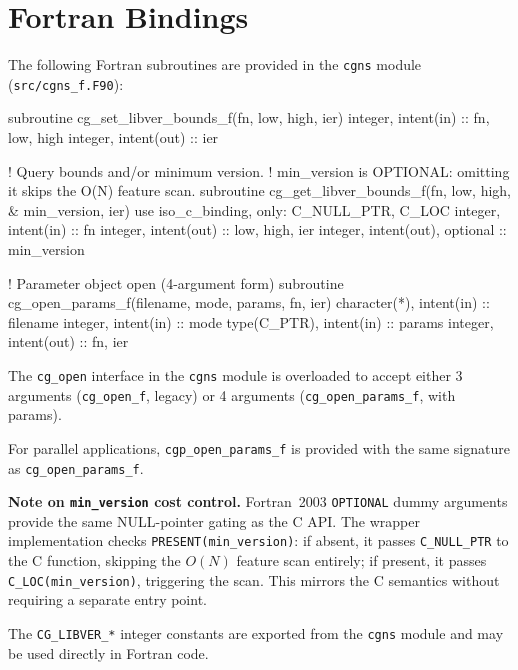 \documentclass[11pt,letterpaper]{article}
\makeatletter
\let\cgns@orig@lstlisting\lstlisting
\let\cgns@endorig@lstlisting\endlstlisting
\renewenvironment{lstlisting}
  {\par\needspace{5\baselineskip}\nolinenumbers\cgns@orig@lstlisting}
  {\cgns@endorig@lstlisting\par\linenumbers}
\makeatother
\begin{document}
\section{Fortran Bindings}

The following Fortran subroutines are provided in the \texttt{cgns}
module (\texttt{src/cgns\_f.F90}):

\begin{lstlisting}[language=Fortran]
subroutine cg_set_libver_bounds_f(fn, low, high, ier)
    integer, intent(in)  :: fn, low, high
    integer, intent(out) :: ier

! Query bounds and/or minimum version.
! min_version is OPTIONAL: omitting it skips the O(N) feature scan.
subroutine cg_get_libver_bounds_f(fn, low, high, &
                                        min_version, ier)
    use iso_c_binding, only: C_NULL_PTR, C_LOC
    integer,           intent(in)            :: fn
    integer,           intent(out)           :: low, high, ier
    integer,           intent(out), optional :: min_version

! Parameter object open (4-argument form)
subroutine cg_open_params_f(filename, mode, params, fn, ier)
    character(*),     intent(in)  :: filename
    integer,          intent(in)  :: mode
    type(C_PTR),      intent(in)  :: params
    integer,          intent(out) :: fn, ier
\end{lstlisting}

The \texttt{cg\_open} interface in the \texttt{cgns} module is
overloaded to accept either 3 arguments (\texttt{cg\_open\_f}, legacy)
or 4 arguments (\texttt{cg\_open\_params\_f}, with params).

For parallel applications, \texttt{cgp\_open\_params\_f} is provided
with the same signature as \texttt{cg\_open\_params\_f}.

\textbf{Note on \texttt{min\_version} cost control.}
Fortran~2003 \texttt{OPTIONAL} dummy arguments provide the same
NULL-pointer gating as the C API.  The wrapper implementation checks
\texttt{PRESENT(min\_version)}: if absent, it passes
\texttt{C\_NULL\_PTR} to the C function, skipping the $O(N)$ feature
scan entirely; if present, it passes \texttt{C\_LOC(min\_version)},
triggering the scan.  This mirrors the C semantics without requiring
a separate entry point.

The \texttt{CG\_LIBVER\_*} integer constants are exported from the
\texttt{cgns} module and may be used directly in Fortran code.
\end{document}
